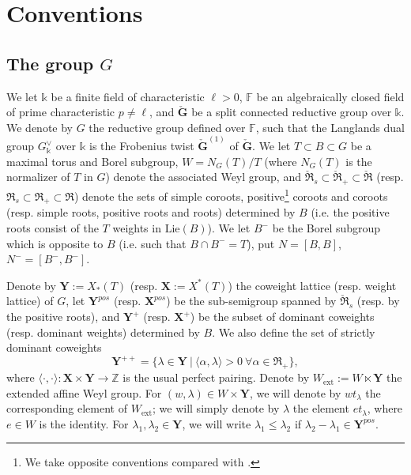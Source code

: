 \documentclass[11pt]{amsart}
\theoremstyle{plain}
\theoremstyle{remark}
\numberwithin{equation}{section}
\begin{document}
	\section{Conventions}\label{section conventions}
	\subsection{The group $G$}\label{subsection the group}
	We let $\mathbb{k}$ be a finite field of characteristic $\ell>0$, $\mathbb{F}$ be an algebraically closed field of prime characteristic $p\neq \ell$, and $\check{\mathbf{G}}$ be a split connected reductive group over $\mathbb{k}$. We denote by $G$ the reductive group defined over $\mathbb{F}$, such that the Langlands dual group $G^\vee_\mathbb{k}$ over $\mathbb{k}$ is the Frobenius twist $\check{\mathbf{G}}^{(1)}$ of $\check{\mathbf{G}}$. We let $T\subset B\subset G$ be a maximal torus and Borel subgroup, $W=N_G(T)/T$ (where $N_G(T)$ is the normalizer of $T$ in $G$) denote the associated Weyl group, and $\check{\mathfrak{R}}_s\subset\check{\mathfrak{R}}_+\subset\check{\mathfrak{R}}$ (resp. $\mathfrak{R}_s\subset \mathfrak{R}_+\subset\mathfrak{R}$) denote the sets of simple coroots, positive\footnote{We take opposite conventions compared with \cite{achar2022geometric}.} coroots and coroots (resp. simple roots, positive roots and roots) determined by $B$ (i.e. the positive roots consist of the $T$ weights in $\mathrm{Lie}(B)$). We let $B^-$ be the Borel subgroup which is opposite to $B$ (i.e. such that $B\cap B^{-}=T$), put $N=[B,B]$, $N^-=[B^-,B^-]$.  
 
 Denote by $\mathbf{Y}:=X_*(T)$ (resp. $\mathbf{X}:=X^*(T)$) the coweight lattice (resp. weight lattice) of $G$, let $\mathbf{Y}^{pos}$ (resp. $\mathbf{X}^{pos}$) be the sub-semigroup spanned by $\check{\mathfrak{R}}_s$ (resp. by the positive roots), and $\mathbf{Y}^+$ (resp. $\mathbf{X}^+$) be the subset of dominant coweights (resp. dominant weights) determined by $B$. We also define the set of strictly dominant coweights
 $$\mathbf{Y}^{++}=\{\lambda\in\mathbf{Y}~|~\langle\alpha,\lambda\rangle>0~\forall \alpha\in\mathfrak{R}_+\},$$
 where $\langle\cdot,\cdot\rangle:\mathbf{X}\times \mathbf{Y}\to\mathbb{Z}$ is the usual perfect pairing. Denote by $W_{\mathrm{ext}}:=W\ltimes\mathbf{Y}$ the extended affine Weyl group. For $(w,\lambda)\in W\times\mathbf{Y}$, we will denote by $wt_\lambda$ the corresponding element of $W_\mathrm{ext}$; we will simply denote by $\lambda$ the element $et_\lambda$, where $e\in W$ is the identity. For $\lambda_1,\lambda_2\in \mathbf{Y}$, we will write $\lambda_1\leq \lambda_2$ if $\lambda_2-\lambda_1\in \mathbf{Y}^{pos}$.
	
\end{document}
